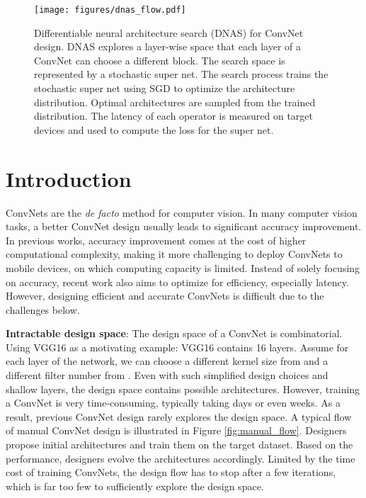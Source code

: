 \documentclass[10pt,twocolumn,letterpaper]{article}
\begin{document}
\begin{figure}[h]
\begin{center}
\texttt{[image: figures/dnas\_flow.pdf]}
\end{center}
\caption{Differentiable neural architecture search (DNAS) for ConvNet design. DNAS explores a layer-wise space that each layer of a ConvNet can choose a different block. The search space is represented by a stochastic super net. The search process trains the stochastic super net using SGD to optimize the architecture distribution. Optimal architectures are sampled from the trained distribution. The latency of each operator is measured on target devices and used to compute the loss for the super net.}
\label{fig:dnas_flow}
\end{figure}

\section{Introduction}
ConvNets are the \textit{de facto} method for computer vision. In many computer vision tasks, a better ConvNet design usually leads to significant accuracy improvement. In previous works, accuracy improvement comes at the cost of higher computational complexity, making it more challenging to deploy ConvNets to mobile devices, on which computing capacity is limited. Instead of solely focusing on accuracy, recent work also aims to optimize for efficiency, especially latency. However, designing efficient and accurate ConvNets is difficult due to the challenges below.

\textbf{Intractable design space}: The design space of a ConvNet is combinatorial. Using VGG16 \cite{simonyan2014very} as a motivating example: VGG16 contains 16 layers. Assume for each layer of the network, we can choose a different kernel size from  and a different filter number from . Even with such simplified design choices and shallow layers, the design space contains  possible architectures. However, training a ConvNet is very time-consuming, typically taking days or even weeks. As a result, previous ConvNet design rarely explores the design space. A typical flow of manual ConvNet design is illustrated in Figure \ref{fig:manual_flow}. Designers propose initial architectures and train them on the target dataset. Based on the performance, designers evolve the architectures accordingly. Limited by the time cost of training ConvNets, the design flow has to stop after a few iterations, which is far too few to sufficiently explore the design space. 
\end{document}
